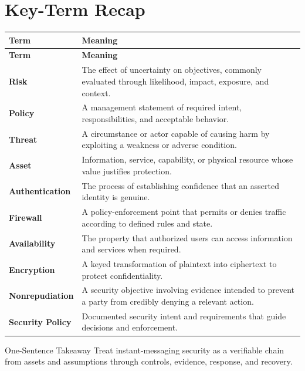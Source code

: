 \documentclass[11pt,letterpaper]{article}
\begin{document}
\section*{Key-Term Recap}
\begin{longtable}{>{\raggedright\arraybackslash}p{}>{\raggedright\arraybackslash}p{}}
\toprule\rowcolor{Navy}\color{white}\textbf{Term} & \color{white}\textbf{Meaning}\\\midrule
\endfirsthead
\toprule\rowcolor{Navy}\color{white}\textbf{Term} & \color{white}\textbf{Meaning}\\\midrule
\endhead
\textbf{Risk} & The effect of uncertainty on objectives, commonly evaluated through likelihood, impact, exposure, and context. \\\midrule
\textbf{Policy} & A management statement of required intent, responsibilities, and acceptable behavior. \\\midrule
\textbf{Threat} & A circumstance or actor capable of causing harm by exploiting a weakness or adverse condition. \\\midrule
\textbf{Asset} & Information, service, capability, or physical resource whose value justifies protection. \\\midrule
\textbf{Authentication} & The process of establishing confidence that an asserted identity is genuine. \\\midrule
\textbf{Firewall} & A policy-enforcement point that permits or denies traffic according to defined rules and state. \\\midrule
\textbf{Availability} & The property that authorized users can access information and services when required. \\\midrule
\textbf{Encryption} & A keyed transformation of plaintext into ciphertext to protect confidentiality. \\\midrule
\textbf{Nonrepudiation} & A security objective involving evidence intended to prevent a party from credibly denying a relevant action. \\\midrule
\textbf{Security Policy} & Documented security intent and requirements that guide decisions and enforcement. \\\midrule
\bottomrule
\end{longtable}
\begin{CornellExamBox}{One-Sentence Takeaway}
Treat instant-messaging security as a verifiable chain from assets and assumptions through controls, evidence, response, and recovery.
\end{CornellExamBox}
\end{document}
